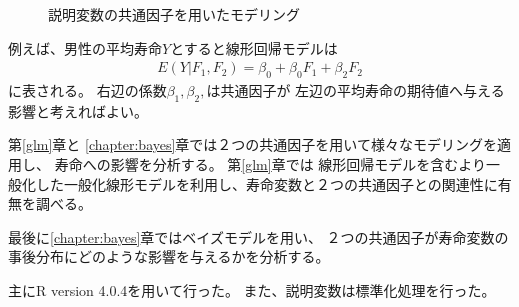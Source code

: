 \begin{figure}[H]
	\caption{説明変数の共通因子を用いたモデリング}
	\label{ModelSuppression}
\end{figure}



例えば、男性の平均寿命$Y$とすると線形回帰モデルは
\begin{eqnarray}
E(Y|F_1, F_2)=\beta_0 +\beta_0F_1 + \beta_2 F_2
\end{eqnarray}
に表される。
右辺の係数$\beta_1, \beta_2, $は共通因子が
左辺の平均寿命の期待値へ与える
影響と考えればよい。


第\ref{glm}章と
\ref{chapter:bayes}章では２つの共通因子を用いて様々なモデリングを適用し、
寿命への影響を分析する。
第\ref{glm}章では
線形回帰モデルを含むより一般化した一般化線形モデルを利用し、寿命変数と２つの共通因子との関連性に有無を調べる。

最後に\ref{chapter:bayes}章ではベイズモデルを用い、
２つの共通因子が寿命変数の事後分布にどのような影響を与えるかを分析する。


主にR version 4.0.4を用いて行った。
また、説明変数は標準化処理を行った。





%
%



%
%
%
%
%
%
%
%
%
